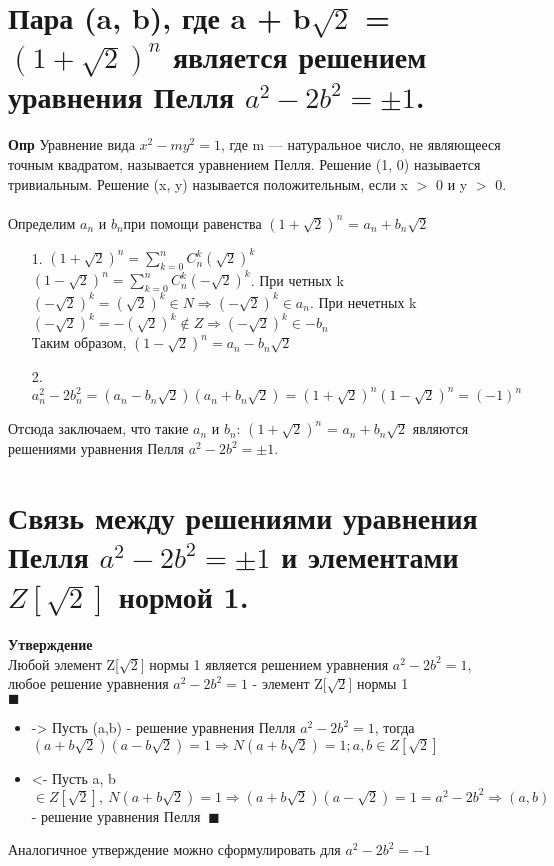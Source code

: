 \section{Пара (a, b), где a + b$\sqrt{2}$ = $(1 + \sqrt{2})^n$ является решением уравнения Пелля $a^2 - 2b^2 = \pm1$.}
\textbf{Опр} Уравнение вида $x^2 - my^2 = 1$, где m — натуральное число, не являющееся точным квадратом, называется уравнением Пелля. Решение (1, 0) называется тривиальным. Решение (x, y)
называется положительным, если x $>$ 0 и y $>$ 0.
\\
\\
Определим $a_n$ и $b_n $при помощи равенства $(1 + \sqrt{2})^n$ = $a_n + b_n\sqrt{2}$
\begin{itemize}
    \item [1.] $(1 + \sqrt{2})^n = \sum_{k = 0}^n C_{n}^k (\sqrt{2})^{k}$ \\ $(1 - \sqrt{2})^n = \sum_{k = 0}^n C_{n}^k (-\sqrt{2})^{k}$. При четных k $(-\sqrt{2})^{k} = (\sqrt{2})^{k}  \in N \Longrightarrow (-\sqrt{2})^{k} \in a_n$. При нечетных k $(-\sqrt{2})^{k} = -(\sqrt{2})^{k} \not\in Z \Longrightarrow (-\sqrt{2})^{k} \in -b_n$ \\ Таким образом,  $(1 - \sqrt{2})^n = a_n - b_n\sqrt{2}$
    
    \item[2.] $a_n^2 - 2b_n^2 = (a_n - b_n\sqrt{2})(a_n + b_n\sqrt{2}) = (1 + \sqrt{2})^n(1 - \sqrt{2})^n= (-1)^n$
\end{itemize}
Отсюда заключаем, что такие $a_n$ и $b_n$: $(1 + \sqrt{2})^n$ = $a_n + b_n\sqrt{2}$ являются решениями уравнения Пелля $a^2 - 2b^2 = \pm1$.


\section{Связь между решениями уравнения Пелля $a^2 - 2b^2 = \pm1$ и элементами \texorpdfstring{$Z[\sqrt{2}]$}{Z[sqrt2]} нормой 1.}
\textbf{Утверждение}\\
Любой элемент Z[$\sqrt{2}$] нормы 1 является решением уравнения $a^2 - 2b^2 = 1$, любое решение уравнения $a^2 - 2b^2 = 1$ - элемент Z[$\sqrt{2}$] нормы 1
\\
$\blacksquare$
\begin{itemize}
    \item -> Пусть (a,b) - решение уравнения Пелля $a^2 - 2b^2 = 1$, тогда $(a + b\sqrt{2})(a - b\sqrt{2}) = 1 \Longrightarrow N(a + b\sqrt{2}) = 1 ;  a,b \in Z[\sqrt{2}]$
    \item <- Пусть a, b $\in Z[\sqrt{2}], \ N(a + b\sqrt{2}) = 1 \Longrightarrow (a + b\sqrt{2})(a - \sqrt{2}) = 1 = a^2 - 2b^2 \Longrightarrow (a,b) $ - решение уравнения Пелля $\ \blacksquare$
\end{itemize}
Аналогичное утверждение можно сформулировать для $a^2 - 2b^2 = -1$


